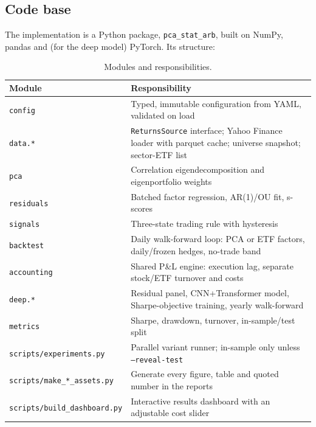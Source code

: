 \documentclass[11pt,a4paper]{article}
\newcommand{\code}[1]{\texttt{#1}}
\begin{document}
\subsection{Code base}
The implementation is a Python package, \code{pca\_stat\_arb}, built on NumPy, pandas and (for
the deep model) PyTorch. Its structure:

\begin{table}[ht]
\centering
\small
\caption{Modules and responsibilities.}
\label{tab:modules}
\begin{tabular}{@{}l>{\raggedright\arraybackslash}p{}@{}}
\toprule
Module & Responsibility \\
\midrule
\code{config} & Typed, immutable configuration from YAML, validated on load \\
\code{data.*} & \code{ReturnsSource} interface; Yahoo Finance loader with parquet cache; universe snapshot; sector-ETF list \\
\code{pca} & Correlation eigendecomposition and eigenportfolio weights \\
\code{residuals} & Batched factor regression, AR(1)/OU fit, s-scores \\
\code{signals} & Three-state trading rule with hysteresis \\
\code{backtest} & Daily walk-forward loop: PCA or ETF factors, daily/frozen hedges, no-trade band \\
\code{accounting} & Shared P\&L engine: execution lag, separate stock/ETF turnover and costs \\
\code{deep.*} & Residual panel, CNN+Transformer model, Sharpe-objective training, yearly walk-forward \\
\code{metrics} & Sharpe, drawdown, turnover, in-sample/test split \\
\code{scripts/experiments.py} & Parallel variant runner; in-sample only unless \code{--reveal-test} \\
\code{scripts/make\_*\_assets.py} & Generate every figure, table and quoted number in the reports \\
\code{scripts/build\_dashboard.py} & Interactive results dashboard with an adjustable cost slider \\
\bottomrule
\end{tabular}
\end{table}
\end{document}
